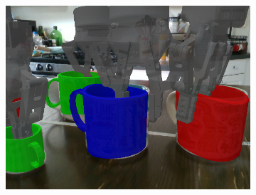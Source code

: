 \documentclass{article}
\begin{document}
\begin{figure}[]
\begin{subfigure}{(\linewidth - 0.05\linewidth)/5}
        \includegraphics[width=\linewidth]{figures/real2sim2real/6/4.png}
    \end{subfigure}


\end{figure}
\end{document}
